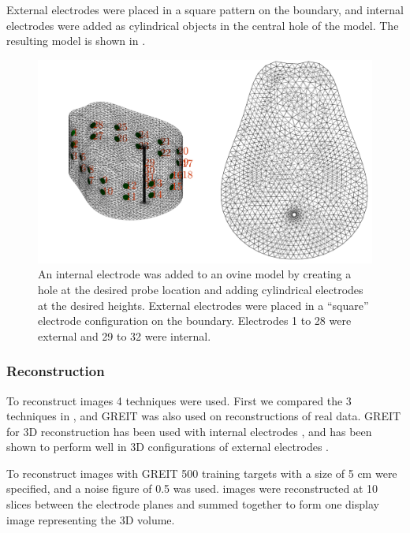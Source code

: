 External electrodes were placed in a square pattern on the boundary, and internal
electrodes were added as cylindrical objects in the central hole of the model.
The resulting model is shown in .

\begin{figure}
    \centering
	\includegraphics[width=\textwidth]{chapter7-internal_elec_motion/imgs/lamb_model.pdf} 
	\caption[Ovine model with internal probe]{\label{fig:internal_lamb_model} 
	An internal electrode was added to an ovine model by creating a hole at the desired probe
	location and adding cylindrical electrodes at the desired heights. External electrodes
	were placed in a ``square'' electrode configuration on the boundary. Electrodes 1 to 28 were 
	external and 29 to 32 were internal.}
\end{figure}

\subsubsection{Reconstruction}
To reconstruct images 4 techniques were used. First we compared the 3
techniques in , and GREIT was also used on reconstructions 
of real data.
GREIT for 3D reconstruction has been used with internal electrodes 
\parencite{nasehi_tehrani_evaluation_2012,nasehi_tehrani_modelling_2012}, 
and has been shown to perform well in 3D configurations of external electrodes
\parencite{grychtol_3d_2016}.

To reconstruct images with GREIT 500 training targets with a size of 5 cm were specified, and a noise figure
of 0.5 was used.
images were reconstructed at 10 slices between the electrode planes and summed together to form one 
display image representing the 3D volume.

